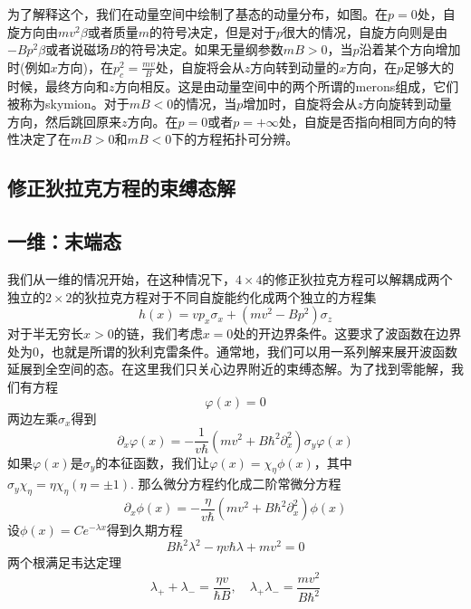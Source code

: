 \documentclass{article}
\numberwithin{equation}{subsection}
\begin{document}
为了解释这个，我们在动量空间中绘制了基态的动量分布，如图。在$p=0$处，自旋方向由$mv^2\beta$或者质量$m$的符号决定，但是对于$p$很大的情况，自旋方向则是由$-Bp^2\beta$或者说磁场$B$的符号决定。如果无量纲参数$mB>0$，当$p$沿着某个方向增加时(例如$x$方向)，在$p^2_c=\frac{mv}{B}$处，自旋将会从$z$方向转到动量的$x$方向，在$p$足够大的时候，最终方向和$z$方向相反。这是由动量空间中的两个所谓的merons组成，它们被称为skymion。对于$mB<0$的情况，当$p$增加时，自旋将会从$z$方向旋转到动量方向，然后跳回原来$z$方向。在$p=0$或者$p=+\infty$处，自旋是否指向相同方向的特性决定了在$mB>0$和$mB<0$下的方程拓扑可分辨。
\subsection{修正狄拉克方程的束缚态解}
\subsection{一维：末端态}
我们从一维的情况开始，在这种情况下，$4\times4$的修正狄拉克方程可以解耦成两个独立的$2\times2$的狄拉克方程对于不同自旋能约化成两个独立的方程集
\begin{equation}
    h(x)=vp_x\sigma_x+(mv^2-Bp^2)\sigma_z
\end{equation}
对于半无穷长$x>0$的链，我们考虑$x=0$处的开边界条件。这要求了波函数在边界处为$0$，也就是所谓的狄利克雷条件。通常地，我们可以用一系列解来展开波函数延展到全空间的态。在这里我们只关心边界附近的束缚态解。为了找到零能解，我们有方程
\begin{equation}
    [vp_x\sigma_x+(mv^2-Bp_x^2)\sigma_z]\varphi(x)=0
\end{equation}
两边左乘$\sigma_x$得到
\begin{equation}
    \partial_x\varphi(x)=-\frac{1}{v\hbar}(mv^2+B\hbar^2\partial_x^2)\sigma_y\varphi(x)
\end{equation}
如果$\varphi(x)$是$\sigma_y$的本征函数，我们让$\varphi(x)=\chi_\eta\phi(x)$，其中$\sigma_y\chi_\eta=\eta\chi_\eta(\eta=\pm1)$. 那么微分方程约化成二阶常微分方程
\begin{equation}
    \partial_x\phi(x)=-\frac{\eta}{v\hbar}(mv^2+B\hbar^2\partial_x^2)\phi(x)
\end{equation}
设$\phi(x)=Ce^{-\lambda x}$得到久期方程
\begin{equation}
    B\hbar^2\lambda^2-\eta v\hbar\lambda+mv^2=0
\end{equation}
两个根满足韦达定理
\begin{equation}
    \lambda_++\lambda_-=\frac{\eta v}{\hbar B},\quad \lambda_+\lambda_-=\frac{mv^2}{B\hbar^2}
\end{equation}
\end{document}
